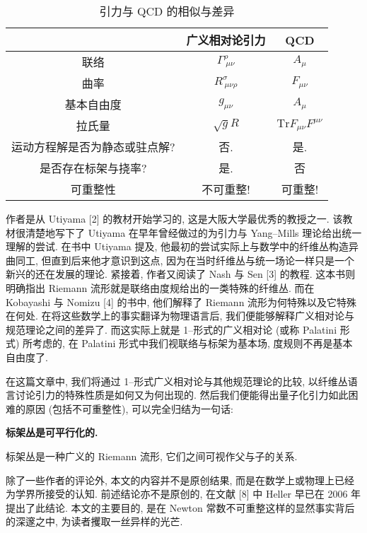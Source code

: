 \documentclass{article}
\begin{document}
\begin{table}
\begin{center}\caption{引力与 QCD 的相似与差异}
\begin{tabular}{|c|c|c|}
  \hline
   & 广义相对论引力 & QCD \\
   \hline
  联络 & $\Gamma^{\rho}_{\ \mu\nu}$ & $A_{\mu}$ \\
  曲率 & $R^{\sigma}_{\ \mu\nu\rho}$ & $F_{\mu\nu}$ \\
  基本自由度 & $g_{\mu\nu}$ & $A_{\mu}$ \\
  拉氏量 & $\sqrt{g}R$ & $\textrm{Tr}{F_{\mu\nu}F^{\mu\nu}}$ \\
  运动方程解是否为静态或驻点解? & 否. & 是. \\
  是否存在标架与挠率? & 是. & 否 \\
  可重整性 & 不可重整! & 可重整! \\
  \hline
\end{tabular}

\end{center}
\end{table}
\indent 作者是从 Utiyama [2] 的教材开始学习的, 这是大阪大学最优秀的教授之一. 该教材很清楚地写下了 Utiyama 在早年曾经做过的为引力与 Yang--Mills 理论给出统一理解的尝试. 在书中 Utiyama 提及, 他最初的尝试实际上与数学中的纤维丛构造异曲同工, 但直到后来他才意识到这点, 因为在当时纤维丛与统一场论一样只是一个新兴的还在发展的理论. 紧接着, 作者又阅读了 Nash 与 Sen [3] 的教程. 这本书则明确指出 Riemann 流形就是联络由度规给出的一类特殊的纤维丛. 而在 Kobayashi 与 Nomizu [4] 的书中, 他们解释了 Riemann 流形为何特殊以及它特殊在何处. 在将这些数学上的事实翻译为物理语言后, 我们便能够解释广义相对论与规范理论之间的差异了. 而这实际上就是 1--形式的广义相对论 (或称 Palatini 形式) 所考虑的, 在 Palatini 形式中我们视联络与标架为基本场, 度规则不再是基本自由度了.
\par
在这篇文章中, 我们将通过 1--形式广义相对论与其他规范理论的比较, 以纤维丛语言讨论引力的特殊性质是如何又为何出现的. 然后我们便能得出量子化引力如此困难的原因 (包括不可重整性), 可以完全归结为一句话:
\begin{center}
\textbf{标架丛是可平行化的.}
\end{center}
标架丛是一种广义的 Riemann 流形, 它们之间可视作父与子的关系.
\par
除了一些作者的评论外, 本文的内容并不是原创结果, 而是在数学上或物理上已经为学界所接受的认知. 前述结论亦不是原创的, 在文献 [8] 中 Heller 早已在 2006 年提出了此结论. 本文的主要目的, 是在 Newton 常数不可重整这样的显然事实背后的深邃之中, 为读者攫取一丝异样的光芒.
\end{document}
